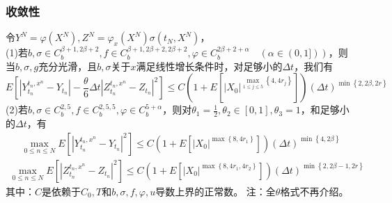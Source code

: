 		\subsubsection{收敛性}
			令$Y^N=\varphi(X^N),Z^N=\varphi_x(X^N)\sigma(t_N,X^N)$，\\
			\noindent (1)若${b,\sigma} \in C_b^{\beta+1,2\beta+2},f \in C_b^{\beta+1,2\beta+2,2\beta+2},\varphi \in C_b^{2\beta+2+\alpha}\quad (\alpha \in (0,1]))$，则当$b,\sigma ,g$充分光滑，且$b,\sigma$关于$x$满足线性增长条件时，对足够小的$\Delta t$，我们有
			\begin{equation*}
			E\left[ {\left| {Y_{{t_n}}^{{t_n},{x^n}} - {Y_{{t_n}}}} \right| - \frac{\theta }{6 }\Delta t{{\left| {Z_{{t_n}}^{{t_n},{x^n}} - {Z_{{t_n}}}} \right|}^2}} \right] \leqslant C\left( {1 + E\left[ {{{\left| {{X_0}} \right|}^{\mathop {\max }\limits_{1 \leqslant j \leqslant 5} \left\{ {4 ,4{r_j}} \right\}}}} \right]} \right){\left( {\Delta t} \right)^{\min \left\{ {2,2\beta ,2r} \right\}}}
			\end{equation*}
			\noindent (2)若${b,\sigma} \in C_b^{2,5},f \in C_b^{2,5,5},\varphi \in C_b^{5+\alpha}$，则对$\theta_1=\frac 12,\theta_2 \in [0,1] ,\theta_3 =1$，和足够小的$\Delta t$，有
			\begin{align*}
			\mathop {\max }\limits_{0 \leqslant n \leqslant N} E\left[ {{{\left| {Y_{{t_n}}^{{t_n},{x^n}} - {Y_{{t_n}}}} \right|}^2}} \right] \leqslant C\left( {1 + E\left[ {{{\left| {{X_0}} \right|}^{\max \left\{ {8 ,4{r_1}} \right\}}}} \right]} \right){\left( {\Delta t} \right)^{\min \left\{ {4 ,2\beta } \right\}}}\end{align*}
			\begin{align*}
			\mathop {\max }\limits_{0 \leqslant n \leqslant N} E\left[ {{{\left| {Z_{{t_n}}^{{t_n},{x^n}} - {Z_{{t_n}}}} \right|}^2}} \right] \leqslant C\left( {1 + E\left[ {{{\left| {{X_0}} \right|}^{\max {{\left\{ {8 ,4{r_1},4 {r_2}} \right\}}}}}} \right]} \right){\left( {\Delta t} \right)^{\min \left\{ {2,2\beta  - 1,2r} \right\}}}\end{align*}
			其中：$C$是依赖于$C_0,T$和$b,\sigma,f,\varphi,u$导数上界的正常数。
			\textcolor[rgb]{1.00,0.00,0.00}{注：全$\theta$格式不再介绍。}

